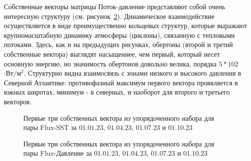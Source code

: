 Собственные векторы матрицы Поток-давление представляют собой очень интересную структуру (см. рисунок~\ref{Flux-press_eigenvectors}). Динамическое взаимодействие осуществляется в виде преимущественно кольцевых структур, которые выражают крупномасштабную динамику атмосферы (циклоны), связанную с тепловыми потоками. Здесь, как и на предыдущих рисунках, обертоны (второй и третий собственные вектора) выглядят насыщеннее, чем первый, который несет основную энергию, но значимость обертонов довольно велика, порядка $5*102$ $\cdot Вт/м^2$. Структурно видна взаимосвязь с зонами низкого и высокого давления в Северной Атлантике: противофазный максимум первого вектора проявляется в южных широтах, минимум - в северных, и наоборот для второго и третьего векторов.

\begin{figure}
	\caption{Первые три собственных вектора из упорядоченного набора для пары Flux-SST за $01.01.23$, $01.04.23$, $01.07.23$ и $01.10.23$}
	\label{Flux-SST_eigenvectors}
\end{figure}

\begin{figure}
	\caption{Первые три собственных вектора из упорядоченного набора для пары Flux-Давление за $01.01.23$, $01.04.23$, $01.07.23$ и $01.10.23$}
	\label{Flux-press_eigenvectors}
\end{figure}



